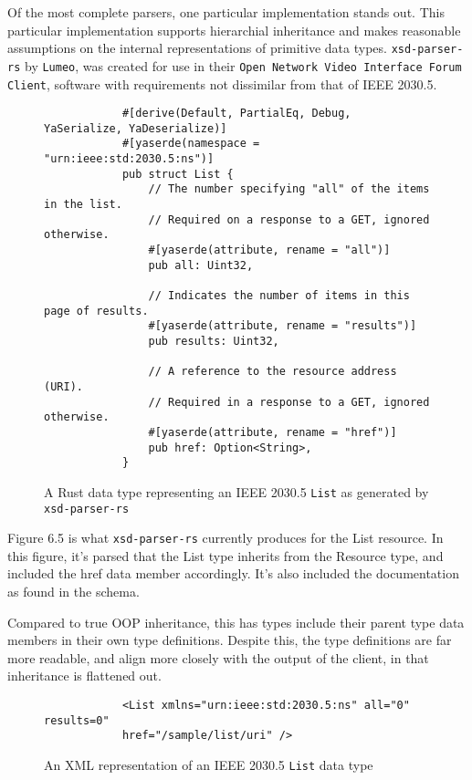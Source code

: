 Of the most complete parsers, one particular implementation stands out. This particular implementation supports hierarchial inheritance and makes reasonable assumptions on the internal representations of primitive data types.
\texttt{xsd-parser-rs} by \texttt{Lumeo}, was created for use in their \texttt{Open Network Video Interface Forum Client}, software with requirements not dissimilar from that of IEEE 2030.5. \cite[]{xsdparserrs}

\begin{figure}[H]
    \begin{center}
        \begin{lstlisting}
            #[derive(Default, PartialEq, Debug, YaSerialize, YaDeserialize)]
            #[yaserde(namespace = "urn:ieee:std:2030.5:ns")]
            pub struct List {
                // The number specifying "all" of the items in the list. 
                // Required on a response to a GET, ignored otherwise.
                #[yaserde(attribute, rename = "all")]
                pub all: Uint32,
            
                // Indicates the number of items in this page of results.
                #[yaserde(attribute, rename = "results")]
                pub results: Uint32,
            
                // A reference to the resource address (URI). 
                // Required in a response to a GET, ignored otherwise.
                #[yaserde(attribute, rename = "href")]
                pub href: Option<String>,
            }
        \end{lstlisting}
        \label{fig:listauto}
        \caption{A Rust data type representing an IEEE 2030.5 \texttt{List} as generated by \texttt{xsd-parser-rs}}
    \end{center}
\end{figure}

Figure 6.5 is what \texttt{xsd-parser-rs} currently produces for the List resource. In this figure, it's parsed that the List type inherits from the Resource type, and included the href data member accordingly. It's also included the documentation as found in the schema.

Compared to true OOP inheritance, this has types include their parent type data members in their own type definitions.
Despite this, the type definitions are far more readable, and align more closely with the output of the client, in that inheritance is flattened out.


\begin{figure}[H]
    \begin{center}
        \begin{lstlisting}
            <List xmlns="urn:ieee:std:2030.5:ns" all="0" results=0" 
            href="/sample/list/uri" />
        \end{lstlisting}
        \label{fig:listxml}
        \caption{An XML representation of an IEEE 2030.5 \texttt{List} data type}
    \end{center}
\end{figure}

